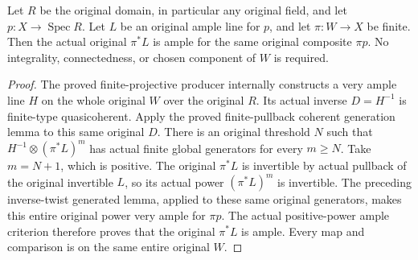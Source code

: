 \begin{proposition}
\label{prop:kn-nadel-whole-finite-ample-pullback}
\leanok
{}
Let $R$ be the original domain, in particular any original field, and let
$p:X\to\operatorname{Spec}R$. Let $L$
be an original ample line for $p$, and let $\pi:W\to X$ be finite.
Then the actual original $\pi^*L$ is ample for the same original composite
$\pi p$. No integrality, connectedness, or chosen component of $W$ is required.
\end{proposition}
\begin{proof}
The proved finite-projective producer internally constructs a very ample
line $H$ on the whole original $W$ over the original $R$. Its actual
inverse $D=H^{-1}$ is finite-type quasicoherent. Apply the proved
finite-pullback coherent generation lemma to this same original $D$.
There is an original threshold $N$ such that
$H^{-1}\otimes(\pi^*L)^m$ has actual finite global generators for every
$m\geq N$. Take $m=N+1$, which is positive. The original $\pi^*L$ is
invertible by actual pullback of the original invertible $L$, so its
actual power $(\pi^*L)^m$ is invertible. The preceding inverse-twist
generated lemma, applied to these same original generators, makes this
entire original power very ample for $\pi p$. The actual positive-power
ample criterion therefore proves that the original $\pi^*L$ is ample.
Every map and comparison is on the same entire original $W$.
\end{proof}

